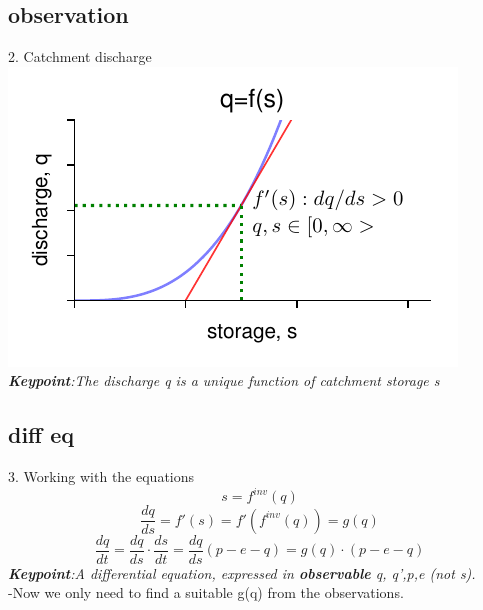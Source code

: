 \documentclass{beamer}
\begin{document}
\subsection{observation}
\begin{frame}{2. Catchment discharge}
	\label{F:1}
	\includegraphics{kirchner_fig1.pdf}
	\\
	
	\emph{\textbf{Keypoint}:The discharge q is a unique function of catchment storage s}
\end{frame}
\subsection{diff eq}
\begin{frame}{3. Working with the equations}
	\begin{equation}
	s= f^{inv}(q)
	\end{equation}
	\begin{equation}
	 \dfrac{dq}{ds}= f'(s) = f'(f^{inv}(q)) = g(q)
	\end{equation}
	\begin{equation}
	\label{eqn:diff_eq}
	\dfrac{dq}{dt}= \dfrac{dq}{ds}  \cdot  \dfrac{ds}{dt} = \dfrac{dq}{ds}(p-e-q) = g(q) \cdot (p-e-q)
	\end{equation}
	\emph{\textbf{Keypoint}:A differential equation, expressed in \textbf{observable} q, q',p,e (not s).}\\
	
	-Now we only need to find a suitable g(q) from the observations.

\end{frame}
\end{document}
